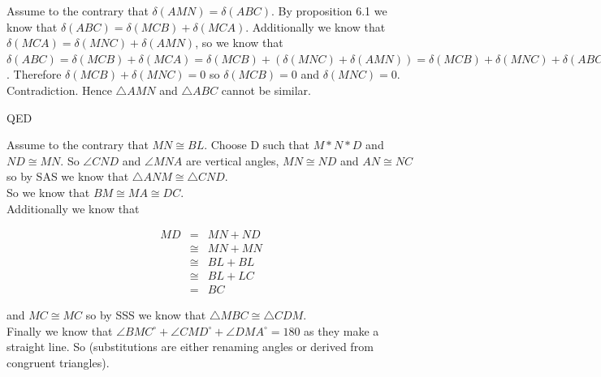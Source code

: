 \documentclass[12pt,letterpaper]{article}
\newcommand{\Proof}{\noindent {\bf Proof: }}
\newcommand{\QED}{\begin{flushright}QED\end{flushright}}
\begin{document}
\Proof

Assume to the contrary that $\delta (AMN) = \delta (ABC)$. By proposition 6.1 we know that $\delta (ABC) = \delta(MCB) + \delta (MCA)$.  Additionally we know that $\delta (MCA) = \delta (MNC) + \delta (AMN)$, so we know that $\delta (ABC) = \delta(MCB) + \delta (MCA) = \delta(MCB) + (\delta (MNC) + \delta (AMN)) = \delta(MCB) + \delta (MNC) + \delta (ABC)$.  Therefore $\delta (MCB) + \delta (MNC) = 0$ so $\delta (MCB)= 0$ and $\delta (MNC) = 0$.  Contradiction.  Hence $\triangle AMN$ and $\triangle ABC$ cannot be similar. 

\QED


\Proof

Assume to the contrary that $MN \cong BL$.  Choose D such that $M*N*D$ and $ND \cong MN$. So $\angle CND$ and $\angle MNA$ are vertical angles, $MN\cong ND$ and $AN \cong NC$ so by SAS we know that $\triangle ANM \cong \triangle CND$.\\

So we know that $BM \cong MA \cong DC$.\\


Additionally we know that 

\begin{eqnarray*}
MD &=& MN + ND \\
&\cong & MN + MN \\
&\cong & BL + BL \\
&\cong & BL + LC\\
&=& BC
\end{eqnarray*}

and $MC \cong MC$ so by SSS we know that $\triangle MBC \cong \triangle CDM$.\\


Finally we know that $\angle BMC^\circ + \angle CMD^\circ + \angle DMA^\circ = 180$ as they make a straight line.  So (substitutions are either renaming angles or derived from congruent triangles).\\
\end{document}
